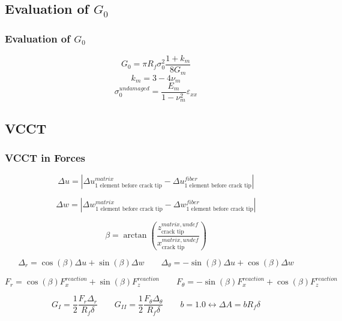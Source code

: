 \documentclass[first,firstsupp,lastsupp,handout,last,hyperref,table]{ETHclass}
\begin{document}
\subsection{Evaluation of $G_{0}$}
\begin{frame}
\frametitle{\small Evaluation of $G_{0}$}
\vspace{-0.7cm}
\footnotesize
\centering
\captionsetup[figure]{font=scriptsize,labelfont=scriptsize}
\begin{equation}
G_{0}=\pi R_{f}\sigma^{2}_{0}\frac{1+k_{m}}{8G_{m}}
\end{equation}
\begin{equation}
k_{m}=3-4\nu_{m}
\end{equation}
\begin{equation}
\sigma_{0}^{undamaged}=\frac{E_{m}}{1-\nu^{2}_{m}}\varepsilon_{xx}
\end{equation}%
\end{frame}

\subsection{VCCT}
\begin{frame}
\frametitle{\small VCCT  in Forces}
\vspace{-0.5cm}
\tiny
\centering

\begin{equation}
\Delta u =\left|\Delta u^{matrix}_{\text{1 element before crack tip}}-\Delta u^{fiber}_{\text{1 element before crack tip}}\right|
\end{equation}

\begin{equation}
\Delta w =\left|\Delta w^{matrix}_{\text{1 element before crack tip}}-\Delta w^{fiber}_{\text{1 element before crack tip}}\right|
\end{equation}



\begin{equation}
\beta=\arctan{\left(\frac{z^{matrix, undef}_{\text{crack tip}}}{x^{matrix, undef}_{\text{crack tip}}}\right)}
\end{equation}

\begin{equation}
\Delta_{r}=\cos{\left(\beta\right)}\Delta u+\sin{\left(\beta\right)}\Delta w\qquad\Delta_{\theta}=-\sin{\left(\beta\right)}\Delta u+\cos{\left(\beta\right)}\Delta w
\end{equation}

\begin{equation}
F_{r}=\cos{\left(\beta\right)}F^{reaction}_{x}+\sin{\left(\beta\right)}F^{reaction}_{z}\qquad F_{\theta}=-\sin{\left(\beta\right)}F^{reaction}_{x}+\cos{\left(\beta\right)}F^{reaction}_{z}
\end{equation}

\begin{equation}
G_{I}=\frac{1}{2}\frac{F_{r}\Delta_{r}}{R_{f}\delta}\qquad G_{II}=\frac{1}{2}\frac{F_{\theta}\Delta_{\theta}}{R_{f}\delta}\qquad b=1.0\leftrightarrow\Delta A = bR_{f}\delta
\end{equation}
\end{frame}
\end{document}
